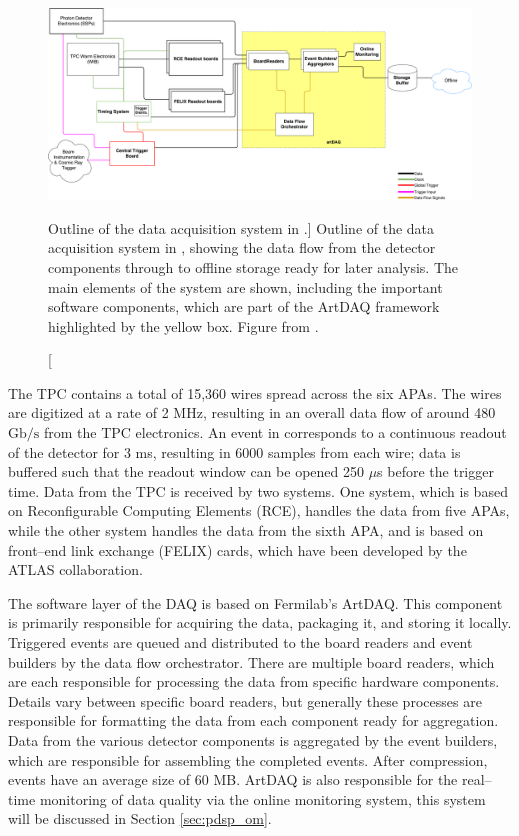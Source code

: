 \begin{figure}

	\centering

	\includegraphics[width=\textwidth]{figures/pdsp_daq.pdf}

	\caption
	[Outline of the data acquisition system in \protodune{}.]
	{Outline of the data acquisition system in \protodune{}, showing the data flow
	from the detector components through to offline storage ready for later
	analysis. The main elements of the system are shown, including the important 
	software components, which are part of the ArtDAQ framework highlighted by 
	the yellow box. Figure from \cite{Abi:2017aow}.}

	\label{fig:pdsp_daq}

\end{figure}

The \protodune{} TPC contains a total of 15,360 wires spread across the six
APAs. The wires are digitized at a rate of 2 MHz, resulting in an overall data
flow of around 480 $\mbox{Gb/s}$ from the TPC electronics. An event in
\protodune{} corresponds to a continuous readout of the detector for 3 ms,
resulting in 6000 samples from each wire; data is buffered such that the readout
window can be opened 250 $\mu$s before the trigger time. Data from the TPC is
received by two systems. One system, which is based on Reconfigurable 
Computing Elements (RCE)\cite{7431254}, handles the data from five APAs, while 
the other system handles the data from the sixth APA, and is based on 
front--end link exchange (FELIX) cards, which have been developed by the 
ATLAS collaboration\cite{Anderson_2016}.

The software layer of the \protodune{} DAQ is based on Fermilab's 
ArtDAQ\cite{6495515}. This component is primarily responsible for acquiring 
the data, packaging it, and storing it locally. Triggered events are queued 
and distributed to the board readers and event builders by the data flow 
orchestrator. There are multiple board readers, which are each responsible for 
processing the data from specific hardware components. Details vary between 
specific board readers, but generally these processes are responsible for 
formatting the data from each component ready for aggregation. Data from the 
various detector components is aggregated by the event builders, which are 
responsible for assembling the completed events. After compression, events have 
an average size of 60 MB. ArtDAQ is also responsible for the real--time 
monitoring of data quality via the online monitoring system, this system will 
be discussed in Section \ref{sec:pdsp_om}.

